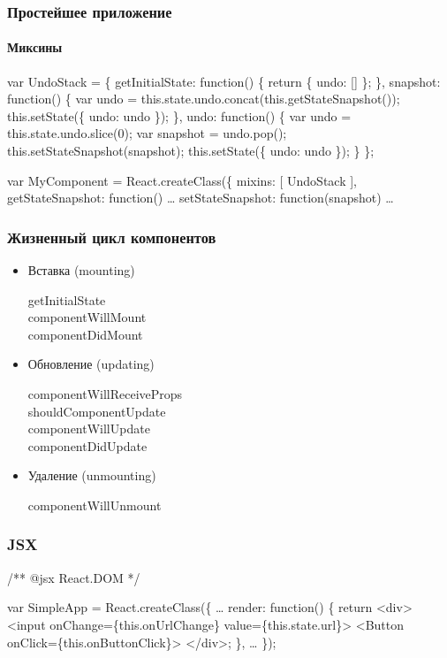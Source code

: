 \documentclass[10pt,utf8]{beamer}
\begin{document}
\begin{frame}[fragile]
  \frametitle{Простейшее приложение}
  \framesubtitle{Миксины}

  \fontsize{9pt}{9.2}\selectfont

  \begin{semiverbatim}
var UndoStack = \{
  getInitialState: function() \{
    return \{ undo: [] \};
  \},
  snapshot: function() \{
    var undo = this.state.undo.concat(\alert{this.getStateSnapshot()});
    this.setState(\{ undo: undo \});
  \},
  undo: function() \{
    var undo = this.state.undo.slice(0);
    var snapshot = undo.pop();
    \alert{this.setStateSnapshot(snapshot)};
    this.setState(\{ undo: undo \});
  \}
\};

var MyComponent = React.createClass(\{
  mixins: [ UndoStack ],
  getStateSnapshot: function() \dots
  setStateSnapshot: function(snapshot) \dots
  \end{semiverbatim}
\end{frame}

\begin{frame}[fragile]
  \frametitle{Жизненный цикл компонентов}

  \begin{itemize}
  \item Вставка (mounting)

    getInitialState \\
    componentWillMount \\
    componentDidMount

    \pause

  \item Обновление (updating)

    componentWillReceiveProps \\
    shouldComponentUpdate \\
    componentWillUpdate \\
    componentDidUpdate

    \pause

  \item Удаление (unmounting)

    componentWillUnmount
  \end{itemize}
\end{frame}

\begin{frame}[fragile]
  \frametitle{JSX}

  \fontsize{9pt}{9.2}\selectfont

  \begin{semiverbatim}
    /** @jsx React.DOM */

    var SimpleApp = React.createClass(\{
      \dots
      render: function() \{
        return \alert{<div>
          <input onChange=}\{this.onUrlChange\} \alert{value=}\{this.state.url\}\alert{>
          <Button onClick=}\{this.onButtonClick\}\alert{>
        </div>;}
      \},
      \dots
    \});
  \end{semiverbatim}
\end{frame}
\end{document}
